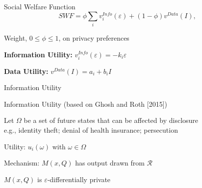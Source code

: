 \begin{frame}{Social Welfare Function}
\begin{equation*}
  SWF = \phi\sum_{i}v_{i}^{Info}(\varepsilon) + (1-\phi)v^{Data}(I),
\end{equation*}
  \begin{wideitemize}
    \item Weight, $0\le\phi\le1$, on privacy preferences
    \item \textbf{Information Utility:} $v_{i}^{Info}(\varepsilon) = -k_{i}\varepsilon$
    \item \textbf{Data Utility:} $v^{Data}(I) = a_{i} + b_{i} I$

  \end{wideitemize}
\end{frame}



\begin{transitionframe}
  \begin{center}
    \Huge Information Utility
  \end{center}
\end{transitionframe}

\begin{frame}{Information Utility}
  (based on Ghosh and Roth [2015])
  \begin{wideitemize}
    \item Let $\Omega$ be a set of future states that can be affected by disclosure \ \\
    e.g., identity theft; denial of health insurance; persecution
    \item Utility: $u_{i}(\omega)$ with $\omega\in\Omega$
    \item Mechanism: $M(x,Q)$ has output drawn from $\mathcal{R}$ 
    \item $M(x,Q)$ is $\varepsilon$-differentially private
  \end{wideitemize}

\end{frame}

